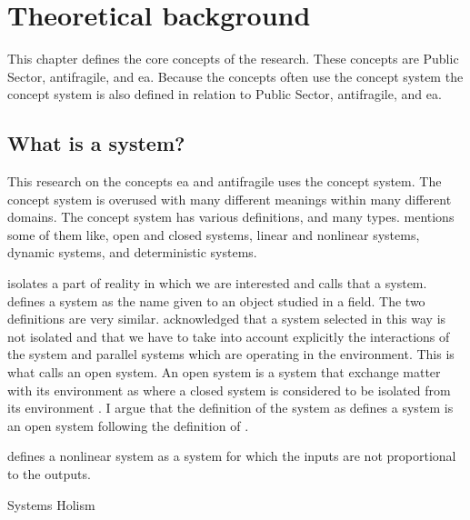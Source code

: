 \chapter{Theoretical background}
\label{ch:theoreticalbackground}
This chapter defines the core concepts of the research. These concepts are Public Sector, \gls{antifragile}, and \acrlong{ea}. Because the concepts often use the concept system the concept system is also defined in relation to Public Sector, \gls{antifragile}, and \acrshort{ea}.

\section{What is a system?}
\label{sec:tbsystem}

This research on the concepts \acrshort{ea} and \gls{antifragile} uses the concept system. The concept system is overused with many different meanings within many different \glspl{domain}. The concept system has various definitions, and many types. \textcite{Rickles2007} mentions some of them like, open and closed systems, linear and nonlinear systems, dynamic systems, and deterministic systems. 

\textcite[p. 13]{Mannaert2016} isolates a part of reality in which we are interested and calls that a system. \textcite[p. 933]{Rickles2007} defines a system as the name given to an object studied in a field. The two definitions are very similar. \textcite[p. 13-14]{Mannaert2016} acknowledged that a system selected in this way is not isolated and that we have to take into account explicitly the interactions of the system and parallel systems which are operating in the environment. This is what \textcite[p. 32]{Bertalanffy1968} calls an open system. An open system is a system that exchange matter with its environment \parencite[p.32]{Bertalanffy1968} as where a closed system is considered to be isolated from its environment \parencite[p. 39]{Bertalanffy1968}. I argue that the definition of the system as \textcite{Mannaert2016} defines a system is an open system following the definition of \parencite{Bertalanffy1968}.

\textcite[p. 934]{Rickles2007} defines a nonlinear system as a system for which the inputs are not proportional to the outputs.

Systems Holism




